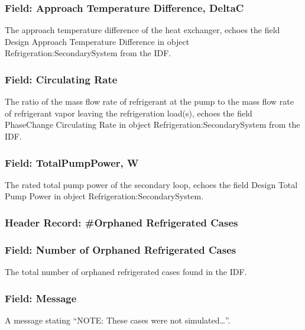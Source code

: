 \subsubsection{Field: Approach Temperature Difference, DeltaC}\label{field-approach-temperature-difference-deltac-2}

The approach temperature difference of the heat exchanger, echoes the field Design Approach Temperature Difference in object Refrigeration:SecondarySystem from the IDF.

\subsubsection{Field: Circulating Rate}\label{field-circulating-rate}

The ratio of the mass flow rate of refrigerant at the pump to the mass flow rate of refrigerant vapor leaving the refrigeration load(s), echoes the field PhaseChange Circulating Rate in object Refrigeration:SecondarySystem from the IDF.

\subsubsection{Field: TotalPumpPower, W}\label{field-totalpumppower-w-1}

The rated total pump power of the secondary loop, echoes the field Design Total Pump Power in object Refrigeration:SecondarySystem.

\subsubsection{Header Record: \#Orphaned Refrigerated Cases}\label{header-record-orphaned-refrigerated-cases}

\subsubsection{Field: Number of Orphaned Refrigerated Cases}\label{field-number-of-orphaned-refrigerated-cases}

The total number of orphaned refrigerated cases found in the IDF.

\subsubsection{Field: Message}\label{field-message}

A message stating ``NOTE: These cases were not simulated\ldots{}''.

